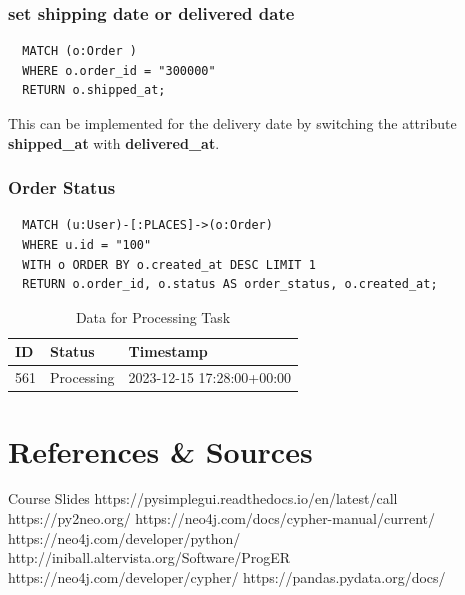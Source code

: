 \documentclass[a4paper,12pt]{article}
\begin{document}
\subsubsection{set shipping date or delivered date}
\begin{verbatim}
  MATCH (o:Order ) 
  WHERE o.order_id = "300000"
  RETURN o.shipped_at;
\end{verbatim}
This can be implemented for the delivery date by switching the attribute \textbf{shipped\_at} with \textbf{delivered\_at}.
\subsubsection{Order Status}
\begin{verbatim}
  MATCH (u:User)-[:PLACES]->(o:Order)
  WHERE u.id = "100"
  WITH o ORDER BY o.created_at DESC LIMIT 1
  RETURN o.order_id, o.status AS order_status, o.created_at;
\end{verbatim}
\begin{table}[h!]
  \centering
  \caption{Data for Processing Task}
  \label{tab:processing_data}
  \begin{tabular}{l l l}
      \toprule
      \textbf{ID} & \textbf{Status} & \textbf{Timestamp} \\
      \midrule
      561 & Processing & 2023-12-15 17:28:00+00:00 \\
      \bottomrule
  \end{tabular}
\end{table}

\newpage
\section{References \& Sources}
  \begin{thebibliography}{9}
    \bibitem{} Course Slides
    \bibitem{} https://pysimplegui.readthedocs.io/en/latest/call%
    \bibitem{} https://py2neo.org/
    \bibitem{} https://neo4j.com/docs/cypher-manual/current/
    \bibitem{} https://neo4j.com/developer/python/
    \bibitem{} http://iniball.altervista.org/Software/ProgER
    \bibitem{} https://neo4j.com/developer/cypher/
    \bibitem{} https://pandas.pydata.org/docs/
  \end{thebibliography}
\end{document}
